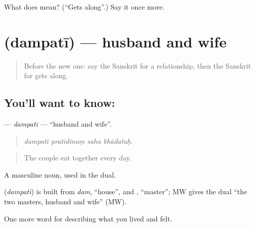 \begin{tcolorbox}[breakable,colback=teal!4,colframe=teal!35!black,title={Before you move on}]
What does  mean? (\textquotedblleft{}Gets along\textquotedblright{}.) Say it once more.
\end{tcolorbox}
\section[\texorpdfstring{\sk{दम्पती} (dampatī)}{दम्पती (dampatī)}]{ (dampatī) — husband and wife}

\label{lesson:SA-C501-dampati}



\begin{quote}
Before the new one: say the Sanskrit for a relationship, then the Sanskrit for gets along.
\end{quote}

\subsection*{You'll want to know: }
\textbf{} — \emph{dampatī} — \textquotedblleft{}husband and wife\textquotedblright{}.

\begin{quote}
   
\end{quote}

\begin{quote}
\emph{dampatī pratidinaṃ saha khādataḥ.}
\end{quote}

\begin{quote}
The couple eat together every day.
\end{quote}

A masculine noun, used in the dual.

\begin{cousinweb}
\textbf{} (\emph{dampatī}) is built from \emph{dam}, \textquotedblleft{}house\textquotedblright{}, and \textbf{}, \textquotedblleft{}master\textquotedblright{}; MW gives the dual \textquotedblleft{}the two masters, husband and wife\textquotedblright{} (MW).
\end{cousinweb}

\begin{grammarlens}[title={What you've built}]
One more word for describing what you lived and felt.
\end{grammarlens}


